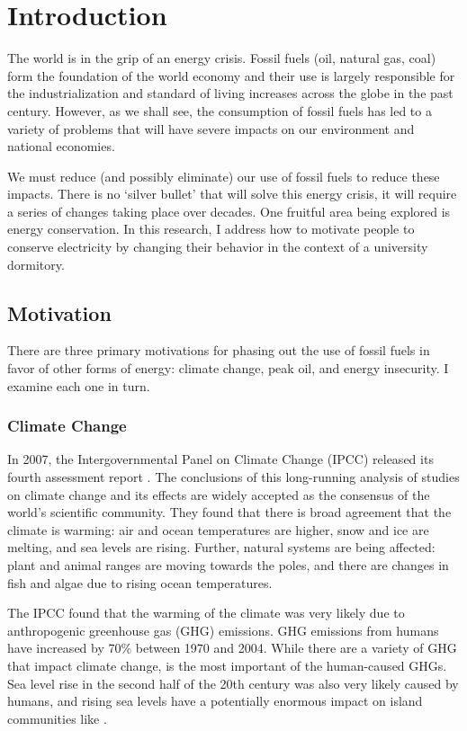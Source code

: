 \chapter{Introduction}

The world is in the grip of an energy crisis. Fossil fuels (oil, natural gas, coal) form the foundation of the world economy and their use is largely responsible for the industrialization and standard of living increases across the globe in the past century. However, as we shall see, the consumption of fossil fuels has led to a variety of problems that will have severe impacts on our environment and national economies. 

We must reduce (and possibly eliminate) our use of fossil fuels to reduce these impacts. There is no `silver bullet' that will solve this energy crisis, it will require a series of changes taking place over decades. One fruitful area being explored is energy conservation. In this research, I address how to motivate people to conserve electricity by changing their behavior in the context of a university dormitory.

\section{Motivation}
\label{sec:motivation}

There are three primary motivations for phasing out the use of fossil fuels in favor of other forms of energy: climate change, peak oil, and energy insecurity. I examine each one in turn.

\subsection{Climate Change}
\label{sec:climate-change}

In 2007, the Intergovernmental Panel on Climate Change (IPCC) released its fourth assessment report \cite{IPCC-synthesis-report-2007}. The conclusions of this long-running analysis of studies on climate change and its effects are widely accepted as the consensus of the world's scientific community. They found that there is broad agreement that the climate is warming: air and ocean temperatures are higher, snow and ice are melting, and sea levels are rising. Further, natural systems are being affected: plant and animal ranges are moving towards the poles, and there are changes in fish and algae due to rising ocean temperatures.

The IPCC found that the warming of the climate was very likely due to anthropogenic greenhouse gas (GHG) emissions. GHG emissions from humans have increased by 70\% between 1970 and 2004. While there are a variety of GHG that impact climate change, \COtwo is the most important of the human-caused GHGs. Sea level rise in the second half of the 20th century was also very likely caused by humans, and rising sea levels have a potentially enormous impact on island communities like \Hawaii.

